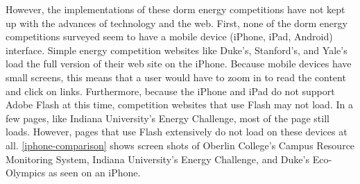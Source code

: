 However, the implementations of these dorm energy competitions have not kept up with the advances of technology and the web.  First, none of the dorm energy competitions surveyed seem to have a mobile device (iPhone, iPad, Android) interface.  Simple energy competition websites like Duke's, Stanford's, and Yale's load the full version of their web site on the iPhone.  Because mobile devices have small screens, this means that a user would have to zoom in to read the content and click on links.  Furthermore, because the iPhone and iPad do not support Adobe Flash at this time, competition websites that use Flash may not load.  In a few pages, like Indiana University's Energy Challenge, most of the page still loads.  However, pages that use Flash extensively do not load on these devices at all.  \autoref{iphone-comparison} shows screen shots of Oberlin College's Campus Resource Monitoring System, Indiana University's Energy Challenge,  and Duke's Eco-Olympics as seen on an iPhone.

